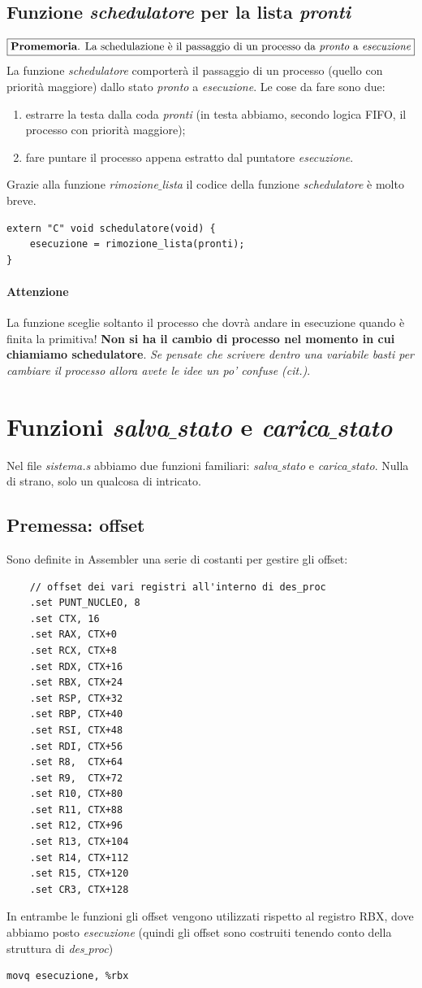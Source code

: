 \documentclass[11pt]{report}
\theoremstyle{definition}
\begin{document}
\subsection{Funzione \emph{schedulatore} per la lista \emph{pronti}}
\[\boxed{\text{\textbf{Promemoria}. La schedulazione è il passaggio di un processo da \emph{pronto} a \emph{esecuzione}}}\]
La funzione \emph{schedulatore} comporterà il passaggio di un processo (quello con priorità maggiore) dallo stato \emph{pronto} a \emph{esecuzione}. Le cose da fare sono due:
\begin{enumerate}
	\item estrarre la testa dalla coda \emph{pronti} (in testa abbiamo, secondo logica FIFO, il processo con priorità maggiore);
	\item fare puntare il processo appena estratto dal puntatore \emph{esecuzione}.
\end{enumerate}
Grazie alla funzione \emph{rimozione$\_$lista} il codice della funzione \emph{schedulatore} è molto breve.
\small
\begin{verbatim}
extern "C" void schedulatore(void) {
    esecuzione = rimozione_lista(pronti);
}
\end{verbatim}
\normalsize
\paragraph{Attenzione} La funzione sceglie soltanto il processo che dovrà andare in esecuzione quando è finita la primitiva! \textbf{Non si ha il cambio di processo nel momento in cui chiamiamo schedulatore}. \textit{Se pensate che scrivere dentro una variabile basti per cambiare il processo allora avete le idee un po' confuse (cit.)}.

\section{Funzioni \emph{salva$\_$stato} e \emph{carica$\_$stato}}

Nel file \emph{sistema.s} abbiamo due funzioni familiari: \emph{salva$\_$stato} e \emph{carica$\_$stato}. Nulla di strano, solo un qualcosa di intricato.

\subsection{Premessa: offset}
Sono definite in Assembler una serie di costanti per gestire gli offset:
\small 
\begin{verbatim}
	// offset dei vari registri all'interno di des_proc
	.set PUNT_NUCLEO, 8
	.set CTX, 16
	.set RAX, CTX+0
	.set RCX, CTX+8
	.set RDX, CTX+16
	.set RBX, CTX+24
	.set RSP, CTX+32
	.set RBP, CTX+40
	.set RSI, CTX+48
	.set RDI, CTX+56
	.set R8,  CTX+64
	.set R9,  CTX+72
	.set R10, CTX+80
	.set R11, CTX+88
	.set R12, CTX+96
	.set R13, CTX+104
	.set R14, CTX+112
	.set R15, CTX+120
	.set CR3, CTX+128
\end{verbatim}
\normalsize 
In entrambe le funzioni gli offset vengono utilizzati rispetto al registro RBX, dove abbiamo posto \emph{esecuzione} (quindi gli offset sono costruiti tenendo conto della struttura di \emph{des$\_$proc})
\begin{verbatim}
movq esecuzione, %rbx
\end{verbatim}
\end{document}
